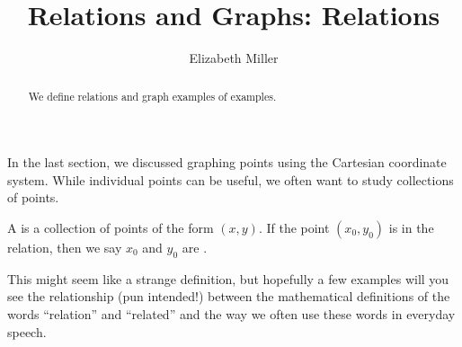 \documentclass[nooutcomes]{ximera}
\author{Elizabeth Miller}
\title{Relations and Graphs: Relations}
\begin{document}
\begin{abstract}
We define relations and graph examples of examples. 
\end{abstract}
\maketitle


In the last section, we discussed graphing points using the Cartesian coordinate system. While individual points can be useful, we often want to study collections of points.

\begin{definition}
A  is a collection of points of the form $(x,y)$.  If the point $(x_0,y_0)$ is in the relation, then we say $x_0$ and $y_0$ are .
\end{definition}

This might seem like a strange definition, but hopefully a few
examples will you see the relationship (pun intended!) between the
mathematical definitions of the words ``relation'' and ``related'' and the
way we often use these words in everyday speech.
\end{document}
